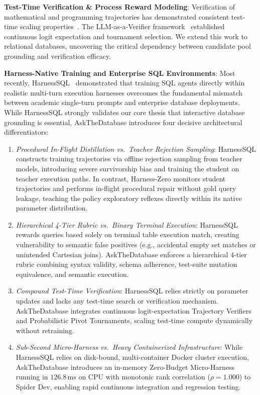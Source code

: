 \documentclass{article}
\theoremstyle{plain}
\theoremstyle{definition}
\theoremstyle{remark}
\begin{document}
\textbf{Test-Time Verification \& Process Reward Modeling}: Verification of mathematical and programming trajectories has demonstrated consistent test-time scaling properties~\citep{cobbe2021gsm8k,lightman2023let}. The LLM-as-a-Verifier framework~\citep{llmverifier2026} established continuous logit expectation and tournament selection. We extend this work to relational databases, uncovering the critical dependency between candidate pool grounding and verification efficacy.

\textbf{Harness-Native Training and Enterprise SQL Environments}: Most recently, HarnessSQL~\citep{yang2026harnesssql} demonstrated that training SQL agents directly within realistic multi-turn execution harnesses overcomes the fundamental mismatch between academic single-turn prompts and enterprise database deployments. While HarnessSQL strongly validates our core thesis that interactive database grounding is essential, AskTheDatabase introduces four decisive architectural differentiators:
\begin{enumerate}[leftmargin=*,itemsep=1pt]
    \item \emph{Procedural In-Flight Distillation vs.\ Teacher Rejection Sampling}: HarnessSQL constructs training trajectories via offline rejection sampling from teacher models, introducing severe survivorship bias and training the student on teacher execution paths. In contrast, Harness-Zero monitors student trajectories and performs in-flight procedural repair without gold query leakage, teaching the policy exploratory reflexes directly within its native parameter distribution.
    \item \emph{Hierarchical 4-Tier Rubric vs.\ Binary Terminal Execution}: HarnessSQL rewards queries based solely on terminal table execution match, creating vulnerability to semantic false positives (e.g., accidental empty set matches or unintended Cartesian joins). AskTheDatabase enforces a hierarchical 4-tier rubric combining syntax validity, schema adherence, test-suite mutation equivalence, and semantic execution.
    \item \emph{Compound Test-Time Verification}: HarnessSQL relies strictly on parameter updates and lacks any test-time search or verification mechanism. AskTheDatabase integrates continuous logit-expectation Trajectory Verifiers and Probabilistic Pivot Tournaments, scaling test-time compute dynamically without retraining.
    \item \emph{Sub-Second Micro-Harness vs.\ Heavy Containerized Infrastructure}: While HarnessSQL relies on disk-bound, multi-container Docker cluster execution, AskTheDatabase introduces an in-memory Zero-Budget Micro-Harness running in $126.8\,\text{ms}$ on CPU with monotonic rank correlation ($\rho = 1.000$) to Spider Dev, enabling rapid continuous integration and regression testing.
\end{enumerate}
\end{document}
